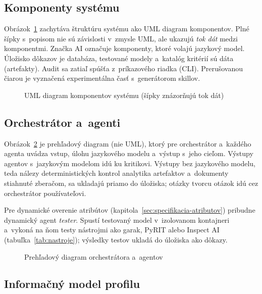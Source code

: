 \subsection{Komponenty systému}
\label{sec:komponenty}

Obrázok~\ref{fig:komponenty} zachytáva štruktúru systému ako UML diagram
komponentov. Plné šípky s~popisom nie sú závislosti v~zmysle UML, ale
ukazujú \emph{tok dát} medzi komponentmi. Značka \textsf{AI} označuje
komponenty, ktoré volajú jazykový model. Úložisko dôkazov je databáza,
testované modely a~katalóg kritérií sú dáta (artefakty). Audit sa zatiaľ
spúšťa z~príkazového riadka (CLI). Prerušovanou čiarou je vyznačená
experimentálna časť s~generátorom skillov.

\begin{figure}[tp]
\centering

\caption{UML diagram komponentov systému (šípky znázorňujú tok dát)}
\label{fig:komponenty}
\end{figure}

\subsection{Orchestrátor a~agenti}
\label{sec:agenti}

Obrázok~\ref{fig:agenti} je prehľadový diagram (nie UML), ktorý pre
orchestrátor a~každého agenta uvádza vstup, úlohu jazykového modelu
a~výstup s~jeho cieľom. Výstupy agentov s~jazykovým modelom idú ku
kritikovi. Výstupy bez jazykového modelu, teda nálezy deterministických
kontrol analytika artefaktov a~dokumenty stiahnuté zberačom, sa ukladajú
priamo do úložiska; otázky tvorcu otázok idú cez orchestrátor
používateľovi.

Pre dynamické overenie atribútov (kapitola~\ref{sec:specifikacia-atributov})
pribudne dynamický agent \emph{tester}. Spustí testovaný model
v~izolovanom kontajneri a~vykoná na ňom testy nástrojmi ako garak, PyRIT
alebo Inspect AI (tabuľka~\ref{tab:nastroje}); výsledky testov ukladá do
úložiska ako dôkazy.

\begin{figure}[ht]
\centering

\caption{Prehľadový diagram orchestrátora a~agentov}
\label{fig:agenti}
\end{figure}

\subsection{Informačný model profilu}
\label{sec:profil}

